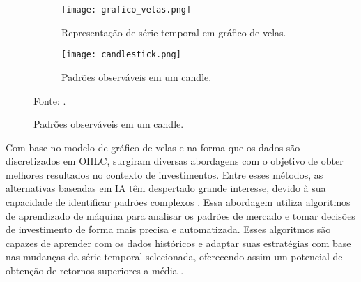 \begin{figure}[htbp]
     \centering
     \caption{Gráfico de velas e suas características observáveis.}
     \begin{subfigure}[b]{0.48\textwidth}
         \centering
         \texttt{[image: grafico\_velas.png]}
         \caption{Representação de série temporal em gráfico de velas.}
         \label{fig:grafico_velas} 
     \end{subfigure}
     \hfill
     \begin{subfigure}[b]{0.48\textwidth}
         \centering
         \texttt{[image: candlestick.png]}
         \caption{Padrões observáveis em um candle.}
         \label{fig:candle_definition}
     \end{subfigure}

     Fonte: .
\end{figure}
Com base no modelo de gráfico de velas e na forma que os dados são discretizados em \ac{OHLC}, surgiram diversas abordagens com o objetivo de obter melhores resultados no contexto de investimentos. Entre esses métodos, as alternativas baseadas em \ac{IA} têm despertado grande interesse, devido à sua capacidade de identificar padrões complexos \cite{dwivedi2021artificial}. Essa abordagem utiliza algoritmos de aprendizado de máquina para analisar os padrões de mercado e tomar decisões de investimento de forma mais precisa e automatizada. Esses algoritmos são capazes de aprender com os dados históricos e adaptar suas estratégias com base nas mudanças da série temporal selecionada, oferecendo assim um potencial de obtenção de retornos superiores a média \cite{strader2020machine}.

